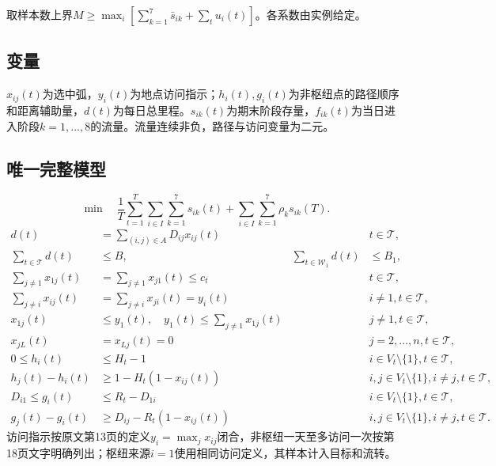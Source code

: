 \documentclass[UTF8,11pt]{ctexart}
\begin{document}
取样本数上界$M\geq\max_i[\sum_{k=1}^7\bar s_{ik}+\sum_tu_i(t)]$。各系数由实例给定。
\subsection*{变量}
$x_{ij}(t)$为选中弧，$y_i(t)$为地点访问指示；$h_i(t),g_i(t)$为非枢纽点的路径顺序和距离辅助量，$d(t)$为每日总里程。$s_{ik}(t)$为期末阶段存量，$f_{ik}(t)$为当日进入阶段$k=1,\ldots,8$的流量。流量连续非负，路径与访问变量为二元。
\subsection*{唯一完整模型}
\begin{equation}
\min\quad \frac1T\sum_{t=1}^T\sum_{i\in I}\sum_{k=1}^7s_{ik}(t)+\sum_{i\in I}\sum_{k=1}^7\rho_k s_{ik}(T).
\end{equation}
\begin{align}
d(t)&=\sum_{(i,j)\in A}D_{ij}x_{ij}(t) && t\in\mathcal T,\\
\sum_{t\in\mathcal T}d(t)&\leq B,&\sum_{t\in\mathcal W_1}d(t)&\leq B_1,\\
\sum_{j\ne1}x_{1j}(t)&=\sum_{j\ne1}x_{j1}(t)\leq c_t &&t\in\mathcal T,\\
\sum_{j\ne i}x_{ij}(t)&=\sum_{j\ne i}x_{ji}(t)=y_i(t) && i\ne1,t\in\mathcal T,\\
x_{1j}(t)&\leq y_1(t),\quad y_1(t)\leq\sum_{j\ne1}x_{1j}(t)&&j\ne1,t\in\mathcal T,\\
x_{jL}(t)&=x_{Lj}(t)=0&&j=2,\ldots,n,t\in\mathcal T,\\
0\leq h_i(t)&\leq H_t-1 && i\in V_t\setminus\{1\},t\in\mathcal T,\\
h_j(t)-h_i(t)&\geq1-H_t(1-x_{ij}(t))&& i,j\in V_t\setminus\{1\},i\ne j,t\in\mathcal T,\\
D_{i1}\leq g_i(t)&\leq R_t-D_{1i}&& i\in V_t\setminus\{1\},t\in\mathcal T,\\
g_j(t)-g_i(t)&\geq D_{ij}-R_t(1-x_{ij}(t))&&i,j\in V_t\setminus\{1\},i\ne j,t\in\mathcal T.
\end{align}
访问指示按原文第13页的定义$y_i=\max_jx_{ij}$闭合，非枢纽一天至多访问一次按第18页文字明确列出；枢纽来源$i=1$使用相同访问定义，其样本计入目标和流转。
\end{document}
